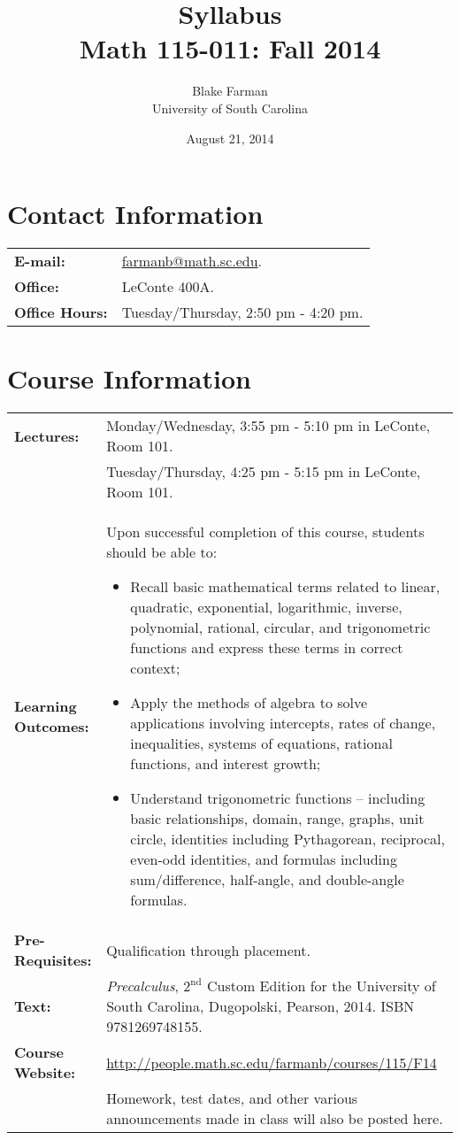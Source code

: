 \documentclass[10pt]{amsart}
\author{Blake Farman\\University of South Carolina}
\title{Syllabus\\Math 115-011: Fall 2014}
\date{August 21, 2014}
\begin{document}
\maketitle

\section*{Contact Information}
\noindent
\begin{tabular}{p{1.4in}p{5in}}
  {\bf E-mail:} &\href{mailto:farmanb@math.sc.edu}{farmanb@math.sc.edu}.\\
  {\bf Office:} & LeConte 400A.\\
  {\bf Office Hours:} & Tuesday/Thursday, 2:50 pm - 4:20 pm.\\
\end{tabular}

\section*{Course Information}
\noindent
\begin{tabular}{p{1.4in}p{5in}}
  {\bf Lectures:} &
  Monday/Wednesday,  3:55 pm - 5:10 pm in LeConte, Room 101.\\
  &Tuesday/Thursday, 4:25 pm - 5:15 pm in LeConte, Room 101.\\
  {\bf Learning Outcomes:} &Upon successful completion of this course, students should be able to:
	\begin{itemize}
	\item
	Recall basic mathematical terms related to linear, quadratic, exponential, logarithmic, inverse, polynomial, rational, circular, and trigonometric functions and express these terms in correct context;
	\item
	Apply the methods of algebra to solve applications involving intercepts, rates of change, inequalities, systems of equations, rational functions, and interest growth;
	\item
	Understand trigonometric functions – including basic relationships, domain, range, graphs, unit circle, identities including Pythagorean, reciprocal, even-odd identities, and formulas including sum/difference, half-angle, and double-angle formulas.
	\end{itemize}\\
  {\bf Pre-Requisites:} &Qualification through placement.\\
  {\bf Text:} & {\it Precalculus}, $2^{\text{nd}}$ Custom Edition for the University of South Carolina, Dugopolski, Pearson, 2014.  ISBN 9781269748155.\\
  {\bf Course Website:} & \url{http://people.math.sc.edu/farmanb/courses/115/F14}\\
  & Homework, test dates, and other various announcements made in class will also be posted here.\\
\end{tabular}
\end{document}

